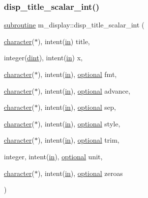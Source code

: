 \subsubsection{\texorpdfstring{disp\+\_\+title\+\_\+scalar\+\_\+int()}{disp\_title\_scalar\_int()}}
{\footnotesize\ttfamily \hyperlink{M__stopwatch_83_8txt_acfbcff50169d691ff02d4a123ed70482}{subroutine} m\+\_\+display\+::disp\+\_\+title\+\_\+scalar\+\_\+int (\begin{DoxyParamCaption}\item[{\hyperlink{option__stopwatch_83_8txt_abd4b21fbbd175834027b5224bfe97e66}{character}($\ast$), intent(\hyperlink{M__journal_83_8txt_afce72651d1eed785a2132bee863b2f38}{in})}]{title,  }\item[{integer(\hyperlink{namespacem__display_a73f772e9702cad6f40b78364fde2c7cd}{dint}), intent(\hyperlink{M__journal_83_8txt_afce72651d1eed785a2132bee863b2f38}{in})}]{x,  }\item[{\hyperlink{option__stopwatch_83_8txt_abd4b21fbbd175834027b5224bfe97e66}{character}($\ast$), intent(\hyperlink{M__journal_83_8txt_afce72651d1eed785a2132bee863b2f38}{in}), \hyperlink{option__stopwatch_83_8txt_aa4ece75e7acf58a4843f70fe18c3ade5}{optional}}]{fmt,  }\item[{\hyperlink{option__stopwatch_83_8txt_abd4b21fbbd175834027b5224bfe97e66}{character}($\ast$), intent(\hyperlink{M__journal_83_8txt_afce72651d1eed785a2132bee863b2f38}{in}), \hyperlink{option__stopwatch_83_8txt_aa4ece75e7acf58a4843f70fe18c3ade5}{optional}}]{advance,  }\item[{\hyperlink{option__stopwatch_83_8txt_abd4b21fbbd175834027b5224bfe97e66}{character}($\ast$), intent(\hyperlink{M__journal_83_8txt_afce72651d1eed785a2132bee863b2f38}{in}), \hyperlink{option__stopwatch_83_8txt_aa4ece75e7acf58a4843f70fe18c3ade5}{optional}}]{sep,  }\item[{\hyperlink{option__stopwatch_83_8txt_abd4b21fbbd175834027b5224bfe97e66}{character}($\ast$), intent(\hyperlink{M__journal_83_8txt_afce72651d1eed785a2132bee863b2f38}{in}), \hyperlink{option__stopwatch_83_8txt_aa4ece75e7acf58a4843f70fe18c3ade5}{optional}}]{style,  }\item[{\hyperlink{option__stopwatch_83_8txt_abd4b21fbbd175834027b5224bfe97e66}{character}($\ast$), intent(\hyperlink{M__journal_83_8txt_afce72651d1eed785a2132bee863b2f38}{in}), \hyperlink{option__stopwatch_83_8txt_aa4ece75e7acf58a4843f70fe18c3ade5}{optional}}]{trim,  }\item[{integer, intent(\hyperlink{M__journal_83_8txt_afce72651d1eed785a2132bee863b2f38}{in}), \hyperlink{option__stopwatch_83_8txt_aa4ece75e7acf58a4843f70fe18c3ade5}{optional}}]{unit,  }\item[{\hyperlink{option__stopwatch_83_8txt_abd4b21fbbd175834027b5224bfe97e66}{character}($\ast$), intent(\hyperlink{M__journal_83_8txt_afce72651d1eed785a2132bee863b2f38}{in}), \hyperlink{option__stopwatch_83_8txt_aa4ece75e7acf58a4843f70fe18c3ade5}{optional}}]{zeroas }\end{DoxyParamCaption})\hspace{0.3cm}{\ttfamily [private]}}



